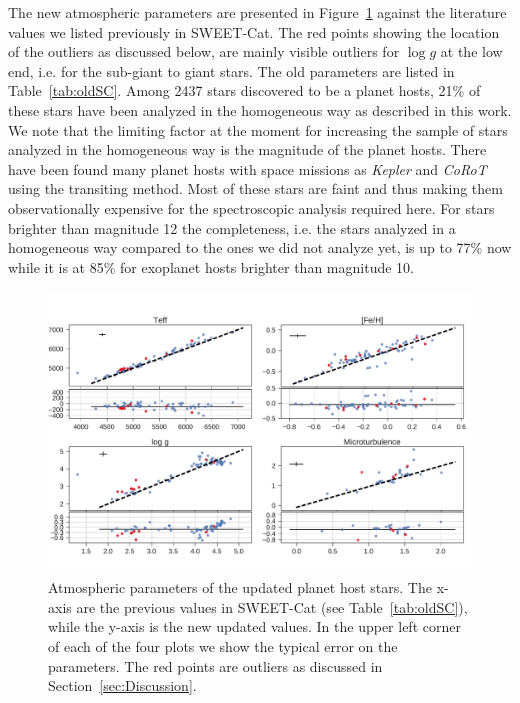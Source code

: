 \documentclass{aa}
\begin{document}
The new atmospheric parameters are presented in Figure~\ref{fig:update} against
the literature values we listed previously in SWEET-Cat. The red points showing
the location of the outliers as discussed below, are mainly visible outliers for
$\log g$ at the low end, i.e. for the sub-giant to giant stars. The old
parameters are listed in Table~\ref{tab:oldSC}. Among 2437 stars discovered to
be a planet hosts, 21\% of these stars have been analyzed in the homogeneous way
as described in this work. We note that the limiting factor at the moment for
increasing the sample of stars analyzed in the homogeneous way is the magnitude
of the planet hosts. There have been found many planet hosts with space missions
as \emph{Kepler} and \emph{CoRoT} using the transiting method. Most of these
stars are faint and thus making them observationally expensive for the
spectroscopic analysis required here. For stars brighter than magnitude 12 the
completeness, i.e. the stars analyzed in a homogeneous way compared to the ones
we did not analyze yet, is up to 77\% now while it is at 85\% for exoplanet
hosts brighter than magnitude 10.

\begin{figure}[tpb]
    \centering
    \includegraphics[width=1.0\linewidth,natwidth=870,natheight=580]{figures/update.pdf}
    \caption{Atmospheric parameters of the updated planet host stars. The x-axis
    are the previous values in SWEET-Cat (see Table~\ref{tab:oldSC}), while the
    y-axis is the new updated values. In the upper left corner of each of the
    four plots we show the typical error on the parameters. The red points
    are outliers as discussed in Section~\ref{sec:Discussion}.}
    \label{fig:update}
\end{figure}
\end{document}
